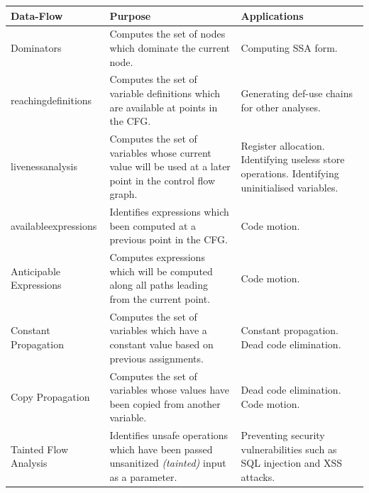 \documentclass[bsc,twoside,singlespacing,parskip,logo,notimes,normalheadings]{infthesis}
\begin{document}
\begin{appendices}
\bgroup
  \vspace{-5mm}
  \begin{tabular}{|l|p{5cm}|p{5cm}|}
    \hline
    {\bf Data-Flow}                         & {\bf Purpose}                                                                                              & {\bf Applications}                                                                              \\ \hline
    Dominators                              & Computes the set of nodes which \gls{dominate} the current node.                                           & Computing SSA form.                                                                             \\ \hline
    \Gls{reachingdefinition}s               & Computes the set of variable definitions which are available at points in the CFG.                         & Generating def-use chains for other analyses.                                                   \\ \hline
    \Gls{livenessanalysis}                  & Computes the set of variables whose current value will be used at a later point in the control flow graph. & Register allocation. Identifying useless store operations. Identifying uninitialised variables. \\ \hline
    \Gls{availableexpression}s              & Identifies expressions which been computed at a previous point in the CFG.                                 & Code motion.                                                                                    \\ \hline
    Anticipable Expressions                 & Computes expressions which will be computed along all paths leading from the current point.                & Code motion.                                                                                    \\ \hline
    Constant Propagation                    & Computes the set of variables which have a constant value based on previous assignments.                   & Constant propagation. Dead code elimination.                                                    \\ \hline
    Copy Propagation                        & Computes the set of variables whose values have been copied from another variable.                         & Dead code elimination. Code motion.                                                             \\ \hline
    Tainted Flow Analysis\cite{TaintedFlow} & Identifies unsafe operations which have been passed unsanitized {\em (tainted)} input as a parameter.      & Preventing security vulnerabilities such as SQL injection and XSS attacks.                      \\ \hline
  \end{tabular}
\egroup


\end{appendices}
\end{document}
